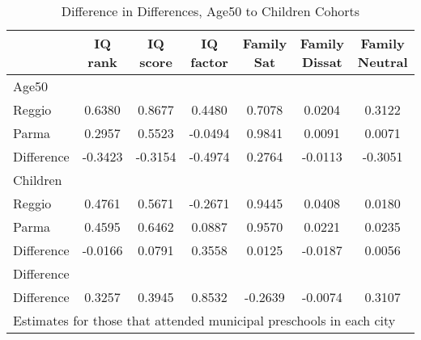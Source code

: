\begin{table}[htbp]\centering
\caption{Difference in Differences, Age50 to Children Cohorts}
\begin{tabular}{l*{6}{c}}
\hline\hline
            &     IQ rank&    IQ score&   IQ factor&  Family Sat&Family Dissat&Family Neutral\\
\hline
Age50       &            &            &            &            &            &            \\
Reggio      &      0.6380&      0.8677&      0.4480&      0.7078&      0.0204&      0.3122\\
Parma       &      0.2957&      0.5523&     -0.0494&      0.9841&      0.0091&      0.0071\\
Difference  &     -0.3423&     -0.3154&     -0.4974&      0.2764&     -0.0113&     -0.3051\\
\hline
Children    &            &            &            &            &            &            \\
Reggio      &      0.4761&      0.5671&     -0.2671&      0.9445&      0.0408&      0.0180\\
Parma       &      0.4595&      0.6462&      0.0887&      0.9570&      0.0221&      0.0235\\
Difference  &     -0.0166&      0.0791&      0.3558&      0.0125&     -0.0187&      0.0056\\
\hline
Difference  &            &            &            &            &            &            \\
Difference  &      0.3257&      0.3945&      0.8532&     -0.2639&     -0.0074&      0.3107\\
\hline\hline
\multicolumn{7}{l}{\footnotesize Estimates for those that attended municipal preschools in each city}\\
\end{tabular}
\end{table}
